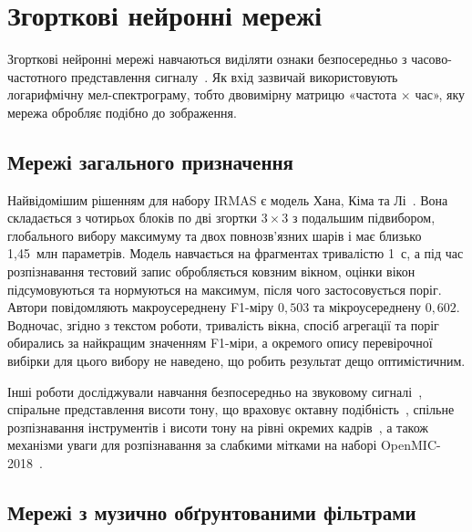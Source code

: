 \section{Згорткові нейронні мережі}
\label{sec:cnn}

Згорткові нейронні мережі навчаються виділяти ознаки безпосередньо з
часово-частотного представлення сигналу~\cite{lecun2015,goodfellow2016}.
Як вхід зазвичай використовують логарифмічну мел-спектрограму, тобто
двовимірну матрицю «частота $\times$ час», яку мережа обробляє подібно до
зображення.

\subsection{Мережі загального призначення}

Найвідомішим рішенням для набору IRMAS є модель
Хана, Кіма та Лі~\cite{han2017}. Вона складається з чотирьох блоків по дві
згортки $3 \times 3$ з подальшим підвибором, глобального вибору максимуму
та двох повнозв'язних шарів і має близько 1,45~млн параметрів. Модель
навчається на фрагментах тривалістю 1~с, а під час розпізнавання
тестовий запис обробляється ковзним вікном, оцінки вікон підсумовуються та
нормуються на максимум, після чого застосовується поріг. Автори
повідомляють макроусереднену F1-міру $0{,}503$ та мікроусереднену
$0{,}602$. Водночас, згідно з текстом роботи, тривалість вікна, спосіб
агрегації та поріг обирались за найкращим значенням F1-міри, а окремого
опису перевірочної вибірки для цього вибору не наведено, що робить
результат дещо оптимістичним.

Інші роботи досліджували навчання безпосередньо на звуковому
сигналі~\cite{li2015}, спіральне представлення висоти тону, що враховує
октавну подібність~\cite{lostanlen2016}, спільне розпізнавання
інструментів і висоти тону на рівні окремих кадрів~\cite{hung2018}, а також
механізми уваги для розпізнавання за слабкими мітками на наборі
OpenMIC-2018~\cite{gururani2019,openmic2018}.

\subsection{Мережі з музично обґрунтованими фільтрами}

